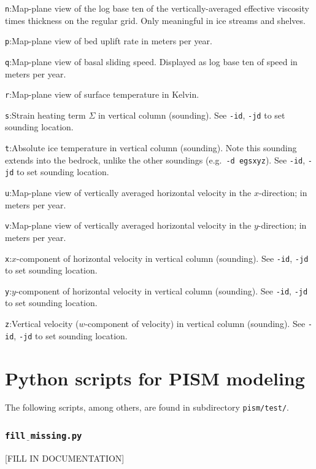 \documentclass[11pt,final]{amsart}
\newcommand{\und}{$\underline{\,\,\,}$}
\begin{document}
\verb|n|:\quad Map-plane view of the log base ten of the vertically-averaged effective viscosity times thickness on the regular grid.  Only meaningful in ice streams and shelves.

\verb|p|:\quad Map-plane view of bed uplift rate in meters per year.

\verb|q|:\quad Map-plane view of basal sliding speed.  Displayed as log base ten of speed in meters per year.

\verb|r|:\quad Map-plane view of surface temperature in Kelvin.

\verb|s|:\quad Strain heating term $\Sigma$ in vertical column (sounding).  See \verb|-id|, \verb|-jd| to set sounding location.

\verb|t|:\quad Absolute ice temperature in vertical column (sounding).  Note this sounding extends into the bedrock, unlike the other soundings (e.g.~\verb|-d egsxyz|).  See \verb|-id|, \verb|-jd| to set sounding location.

\verb|u|:\quad Map-plane view of vertically averaged horizontal velocity in the $x$-direction;  in meters per year.

\verb|v|:\quad Map-plane view of vertically averaged horizontal velocity in the $y$-direction;  in meters per year.

\verb|x|:\quad $x$-component of horizontal velocity in vertical column (sounding).  See \verb|-id|, \verb|-jd| to set sounding location.

\verb|y|:\quad $y$-component of horizontal velocity in vertical column (sounding).  See \verb|-id|, \verb|-jd| to set sounding location.

\verb|z|:\quad Vertical velocity ($w$-component of velocity) in vertical column (sounding).  See \verb|-id|, \verb|-jd| to set sounding location.



\clearpage \newpage
\section{Python scripts for PISM modeling}\label{sect:scripts}

The following scripts, among others, are found in subdirectory \verb|pism/test/|.

\subsubsection*{\Large{\texttt{fill\und missing.py}}}  [FILL IN DOCUMENTATION]
\end{document}
